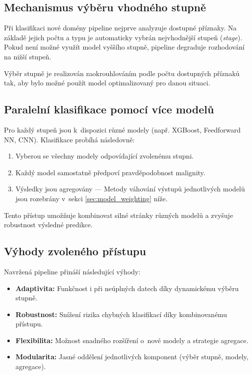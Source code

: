 \subsection{Mechanismus výběru vhodného stupně}

Při klasifikaci nové domény pipeline nejprve analyzuje dostupné příznaky. Na základě jejich počtu a typu je automaticky vybrán nejvhodnější stupeň (\textit{stage}). Pokud není možné využít model vyššího stupně, pipeline degraduje rozhodování na nižší stupeň.

Výběr stupně je realizován zaokrouhlováním podle počtu dostupných příznaků tak, aby bylo možné použít model optimalizovaný pro danou situaci.

\subsection{Paralelní klasifikace pomocí více modelů}

Pro každý stupeň jsou k~dispozici různé modely (např. XGBoost, Feedforward NN, CNN). Klasifikace probíhá následovně:

\begin{enumerate}
    \item Vyberou se všechny modely odpovídající zvolenému stupni.
    \item Každý model samostatně předpoví pravděpodobnost malignity.
    \item Výsledky jsou agregovány — Metody váhování výstupů jednotlivých modelů jsou rozebrány v~sekci \ref{sec:model_weighting} níže. 
\end{enumerate}

Tento přístup umožňuje kombinovat silné stránky různých modelů a zvyšuje robustnost výsledné predikce.

\subsection{Výhody zvoleného přístupu}

Navržená pipeline přináší následující výhody:

\begin{itemize}
    \item \textbf{Adaptivita:} Funkčnost i při neúplných datech díky dynamickému výběru stupně.
    \item \textbf{Robustnost:} Snížení rizika chybných klasifikací díky kombinovanému přístupu.
    \item \textbf{Flexibilita:} Možnost snadného rozšíření o~nové modely a strategie agregace.
    \item \textbf{Modularita:} Jasné oddělení jednotlivých komponent (výběr stupně, modely, agregace).
\end{itemize}

